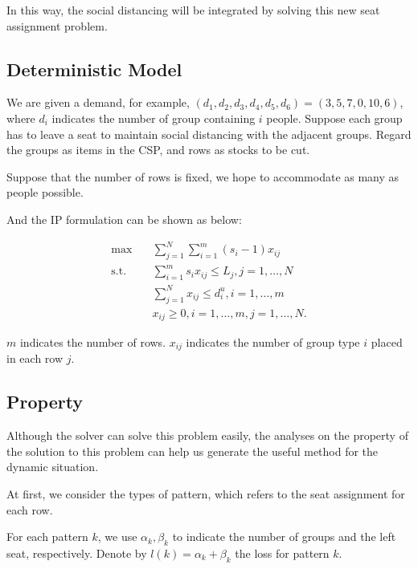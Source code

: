 In this way, the social distancing will be integrated by solving this new seat assignment problem.


\subsection{Deterministic Model}

We are given a demand, for example, $(d_1, d_2, d_3, d_4, d_5, d_6) = (3,5,7,0,10,6)$, where $d_i$ indicates the number of group containing $i$ people. Suppose each group has to leave a seat to maintain social distancing with the adjacent groups. Regard the groups as items in the CSP, and rows as stocks to be cut.

Suppose that the number of rows is fixed, we hope to accommodate as many as people possible.

And the IP formulation can be shown as below:

\begin{equation}\label{deter_upper}
    \begin{aligned}
      \max \quad & \sum_{j =1}^{N} \sum_{i = 1}^{m} (s_i -1) x_{ij} \\
      \text {s.t.} \quad & \sum_{i = 1}^{m} s_i x_{ij} \leq L_{j}, j=1,\ldots,N \\
      & \sum_{j =1}^{N} x_{ij} \leq d_{i}^{u}, i=1,\ldots,m \\
      & x_{ij} \geq 0, i=1,\ldots,m, j=1,\ldots,N.
    \end{aligned}
\end{equation}

$m$ indicates the number of rows. $x_{ij}$ indicates the number of group type $i$ placed in each row $j$.

\subsection{Property}

Although the solver can solve this problem easily, the analyses on the property of the solution to this problem can help us generate the useful method for the dynamic situation. 

At first, we consider the types of pattern, which refers to the seat assignment for each row.

For each pattern $k$, we use $\alpha_k, \beta_k$ to indicate the number of groups and the left seat, respectively. Denote by $l(k) = \alpha_k + \beta_k$ the loss for pattern $k$.

